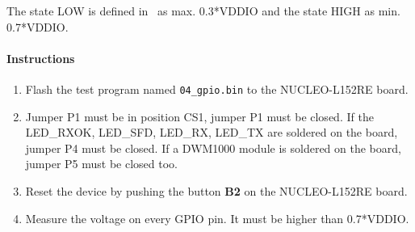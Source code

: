 \documentclass[journal,comsoc]{IEEEtran}
\begin{document}
The state LOW is defined in~\cite{dw1000ds} as max. 0.3*VDDIO and the state HIGH as min. 0.7*VDDIO. 
\paragraph{Instructions}
\begin{enumerate}
	\item Flash the test program named \texttt{04\_gpio.bin} to the NUCLEO-L152RE board.
	\item Jumper P1 must be in position CS1, jumper P1 must be closed. If the LED\_RXOK, LED\_SFD, LED\_RX, LED\_TX are soldered on the board, jumper P4 must be closed. If a DWM1000 module is soldered on the board, jumper P5 must be closed too.
	\item Reset the device by pushing the button \textbf{B2} on the NUCLEO-L152RE board.
	\item Measure the voltage on every GPIO pin. It must be higher than 0.7*VDDIO.
\end{enumerate}
\end{document}
